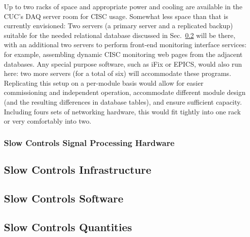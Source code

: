 Up to two racks of space and appropriate power and cooling are available
in the CUC's DAQ server room for CISC usage.  Somewhat less space than
that is currently envisioned: Two servers (a primary server and a
replicated backup) suitable for the needed relational database discussed
in Sec.~\ref{sec:fdsp-slow-cryo-sw} will be there, with an additional
two servers to perform front-end monitoring interface services: for
example, assembling dynamic CISC monitoring web pages from the adjacent
databases.  Any special purpose software, such as iFix or EPICS, would
also run here: two more servers (for a total of six) will accommodate
these programs.
Replicating this setup on a per-module basis would allow for easier
commissioning and independent operation, accommodate different module
design (and the resulting differences in database tables), and ensure
sufficient capacity.  Including fours sets of networking hardware, this
would fit tightly into one rack or very comfortably into two.

\subsubsection{Slow Controls Signal Processing Hardware}
\label{sec:fdsp-slow-cryo-slow-dsp}



\subsection{Slow Controls Infrastructure}
\label{sec:fdsp-slow-cryo-slow-infra}

\subsection{Slow Controls Software}
\label{sec:fdsp-slow-cryo-sw}

\subsection{Slow Controls Quantities}
\label{sec:fdsp-slow-cryo-quant}

